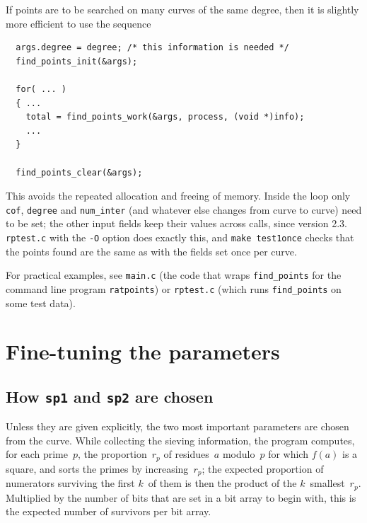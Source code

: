 \documentclass[12pt,a4paper,oneside]{amsart}
\begin{document}
If points are to be searched on many curves of the same degree,
then it is slightly more efficient to use the sequence

\begin{verbatim}
  args.degree = degree; /* this information is needed */
  find_points_init(&args);

  for( ... )
  { ...
    total = find_points_work(&args, process, (void *)info);
    ...
  }

  find_points_clear(&args);
\end{verbatim}

This avoids the repeated allocation and freeing of memory. Inside the loop
only \texttt{cof}, \texttt{degree} and \texttt{num\_inter} (and whatever
else changes from curve to curve) need to be set; the other input fields
keep their values across calls, since version 2.3. \texttt{rptest.c} with
the \verb+-O+ option does exactly this, and \texttt{make test1once} checks
that the points found are the same as with the fields set once per curve.

For practical examples, see \texttt{main.c} (the code that wraps
\texttt{find\_points} for the command line program \texttt{ratpoints}) or
\texttt{rptest.c} (which runs \texttt{find\_points} on some test data).


\section{Fine-tuning the parameters}\label{sec:tuning}

\subsection{How \texttt{sp1} and \texttt{sp2} are chosen}\label{sec:spchoice}

Unless they are given explicitly, the two most important parameters are
chosen from the curve. While collecting the sieving information, the program
computes, for each prime~$p$, the proportion~$r_p$ of residues~$a$ modulo~$p$
for which $f(a)$ is a square, and sorts the primes by increasing~$r_p$; the
expected proportion of numerators surviving the first $k$~of them is then
the product of the $k$~smallest~$r_p$. Multiplied by the number of bits that
are set in a bit array to begin with, this is the expected number of
survivors per bit array.
\end{document}
